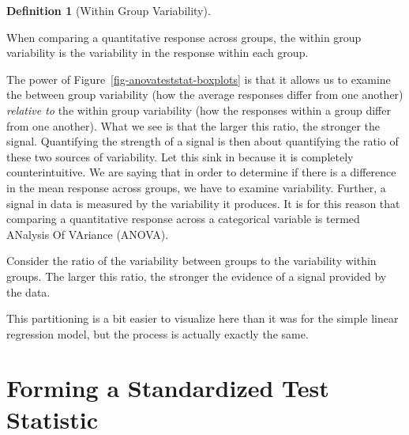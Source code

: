 \documentclass[
  letterpaper,
  DIV=11,
  numbers=noendperiod]{scrreprt}
\theoremstyle{definition}
\newtheorem{definition}{Definition}[chapter]
\theoremstyle{definition}
\theoremstyle{plain}
\theoremstyle{remark}
\begin{document}
\begin{definition}[Within Group
Variability]\protect\hypertarget{def-within-group-variability}{}\label{def-within-group-variability}

When comparing a quantitative response across groups, the within group
variability is the variability in the response within each group.

\end{definition}

The power of Figure~\ref{fig-anovateststat-boxplots} is that it allows
us to examine the between group variability (how the average responses
differ from one another) \emph{relative to} the within group variability
(how the responses within a group differ from one another). What we see
is that the larger this ratio, the stronger the signal. Quantifying the
strength of a signal is then about quantifying the ratio of these two
sources of variability. Let this sink in because it is completely
counterintuitive. We are saying that in order to determine if there is a
difference in the mean response across groups, we have to examine
variability. Further, a signal in data is measured by the variability it
produces. It is for this reason that comparing a quantitative response
across a categorical variable is termed ANalysis Of VAriance (ANOVA).

\begin{tcolorbox}[enhanced jigsaw, colbacktitle=quarto-callout-tip-color!10!white, colback=white, left=2mm, title=\textcolor{quarto-callout-tip-color}{\faLightbulb}\hspace{0.5em}{Big Idea}, toptitle=1mm, leftrule=.75mm, breakable, bottomrule=.15mm, arc=.35mm, rightrule=.15mm, toprule=.15mm, coltitle=black, opacityback=0, colframe=quarto-callout-tip-color-frame, opacitybacktitle=0.6, bottomtitle=1mm, titlerule=0mm]

Consider the ratio of the variability between groups to the variability
within groups. The larger this ratio, the stronger the evidence of a
signal provided by the data.

\end{tcolorbox}

This partitioning is a bit easier to visualize here than it was for the
simple linear regression model, but the process is actually exactly the
same.

\section{Forming a Standardized Test
Statistic}\label{forming-a-standardized-test-statistic}
\end{document}
